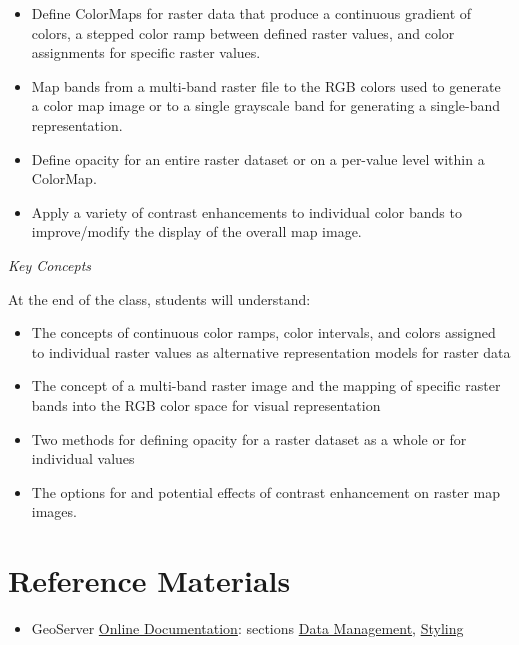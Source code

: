 \documentclass[]{book}
\providecommand{\tightlist}{%
  \setlength{\itemsep}{0pt}\setlength{\parskip}{0pt}}
\begin{document}
\begin{itemize}
\tightlist
\item
  Define ColorMaps for raster data that produce a continuous gradient of
  colors, a stepped color ramp between defined raster values, and color
  assignments for specific raster values.
\item
  Map bands from a multi-band raster file to the RGB colors used to
  generate a color map image or to a single grayscale band for
  generating a single-band representation.
\item
  Define opacity for an entire raster dataset or on a per-value level
  within a ColorMap.
\item
  Apply a variety of contrast enhancements to individual color bands to
  improve/modify the display of the overall map image.
\end{itemize}

\emph{Key Concepts}

At the end of the class, students will understand:

\begin{itemize}
\tightlist
\item
  The concepts of continuous color ramps, color intervals, and colors
  assigned to individual raster values as alternative representation
  models for raster data
\item
  The concept of a multi-band raster image and the mapping of specific
  raster bands into the RGB color space for visual representation
\item
  Two methods for defining opacity for a raster dataset as a whole or
  for individual values
\item
  The options for and potential effects of contrast enhancement on
  raster map images.
\end{itemize}

\section{Reference Materials}\label{week15-reference}

\begin{itemize}
\tightlist
\item
  GeoServer
  \href{http://docs.geoserver.org/stable/en/user/index.html}{Online
  Documentation}: sections
  \href{http://docs.geoserver.org/latest/en/user/data/index.html\#data}{Data
  Management},
  \href{http://docs.geoserver.org/latest/en/user/styling/index.html\#styling}{Styling}
\end{itemize}
\end{document}
